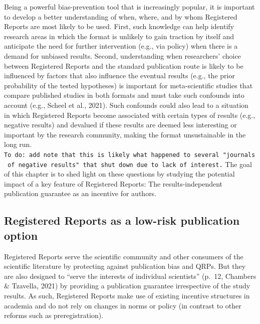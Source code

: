 \documentclass[british,,doc,mask,floatsintext]{apa6}
\begin{document}
Being a powerful bias-prevention tool that is increasingly popular, it is important to develop a better understanding of when, where, and by whom Registered Reports are most likely to be used.
First, such knowledge can help identify research areas in which the format is unlikely to gain traction by itself and anticipate the need for further intervention (e.g., via policy) when there is a demand for unbiased results.
Second, understanding when researchers' choice between Registered Reports and the standard publication route is likely to be influenced by factors that also influence the eventual results (e.g., the prior probability of the tested hypotheses) is important for meta-scientific studies that compare published studies in both formats and must take such confounds into account (e.g., Scheel et al., 2021).
Such confounds could also lead to a situation in which Registered Reports become associated with certain types of results (e.g., negative results) and devalued if these results are deemed less interesting or important by the research community, making the format unsustainable in the long run. \texttt{To\ do:\ add\ note\ that\ this\ is\ likely\ what\ happened\ to\ several\ "journals\ of\ negative\ results"\ that\ shut\ down\ due\ to\ lack\ of\ interest.}
The goal of this chapter is to shed light on these questions by studying the potential impact of a key feature of Registered Reports: The results-independent publication guarantee as an incentive for authors.

\hypertarget{registered-reports-as-a-low-risk-publication-option}{%
\subsection{Registered Reports as a low-risk publication option}\label{registered-reports-as-a-low-risk-publication-option}}

Registered Reports serve the scientific community and other consumers of the scientific literature by protecting against publication bias and QRPs.
But they are also designed to \enquote{serve the interests of individual scientists} (p.~12, Chambers \& Tzavella, 2021) by providing a publication guarantee irrespective of the study results.
As such, Registered Reports make use of existing incentive structures in academia and do not rely on changes in norms or policy (in contrast to other reforms such as preregistration).
\end{document}
